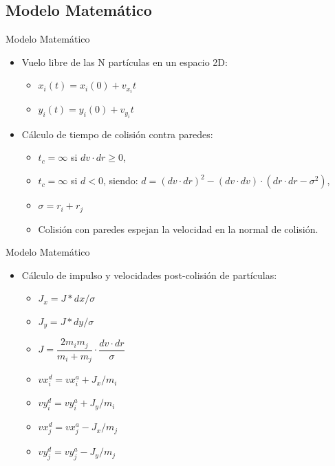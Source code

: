 \documentclass{beamer}
\begin{document}
\subsection{Modelo Matemático}
\begin{frame}{Modelo Matemático}
  \begin{itemize}
    \item Vuelo libre de las N partículas en un espacio 2D:
    \begin{itemize}
      \item $x_i(t) = x_i(0) + v_{x_i} t$
      \item $y_i(t) = y_i(0) + v_{y_i} t$
    \end{itemize}
    \item Cálculo de tiempo de colisión contra paredes:
    \begin{itemize}
      \item $t_{c} = \infty$ si $dv \cdot dr \geqslant 0$,
      \item $t_{c} = \infty$ si $d < 0$, siendo: $d = (dv \cdot dr)^2 - (dv \cdot dv)\cdot(dr \cdot dr - \sigma^2 )$,
      \item $\sigma = r_i + r_j$
      \item Colisión con paredes espejan la velocidad en la normal de colisión.
    \end{itemize}
  \end{itemize}
\end{frame}

\begin{frame}{Modelo Matemático}
  \begin{itemize}
    \item Cálculo de impulso y velocidades post-colisión de partículas:
      \begin{itemize}
        \item $J_x = J*dx/\sigma$
        \item $J_y = J*dy/\sigma$
        \item $J = \dfrac{2 m_i m_j}{m_i + m_j} \cdot \dfrac{dv \cdot dr}{\sigma}$
        \item $vx_i^d = vx_i^a + J_x/m_i$
        \item $vy_i^d = vy_i^a + J_y/m_i$
        \item $vx_j^d = vx_j^a - J_x/m_j$
        \item $vy_j^d = vy_j^a - J_y/m_j$
      \end{itemize}
  \end{itemize}
\end{frame}
\end{document}
